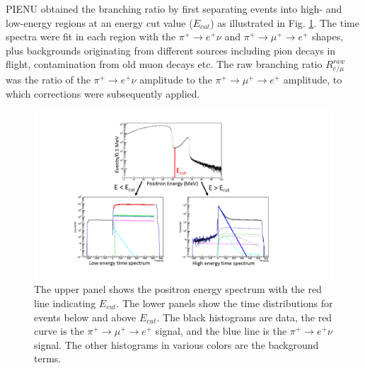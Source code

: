  PIENU obtained the branching ratio by first separating events into high- and low-energy regions at an energy cut value ($E_{cut}$) as illustrated in Fig. \ref{fig:analysis}. The time spectra were fit in each region with the $\pi^+ \rightarrow e^+ \nu$ and $\pi^+ \rightarrow \mu^+ \rightarrow e^+$ shapes, plus backgrounds originating from different sources including pion decays in flight, contamination from old muon decays etc. The raw branching ratio $R^{raw}_{e/\mu}$ was the ratio of the $\pi^+ \rightarrow e^+ \nu$ amplitude to the $\pi^+ \rightarrow \mu^+ \rightarrow e^+$ amplitude, to which corrections were subsequently applied. %
 
\begin{figure}[h!]
\centering
\includegraphics[scale=0.5]{sections/figures/Analysis.png}
\caption{The upper panel shows the positron energy spectrum with the red line indicating $E_{cut}$. The lower panels show the time distributions for events below and above $E_{cut}$. The black histograms are data, the red curve is the $\pi^+ \to \mu^+ \to e^+$ signal, and the blue line is the $\pi^+ \to e^+ \nu$ signal. The other histograms in various colors are the background terms.}
\label{fig:analysis}
\end{figure}

